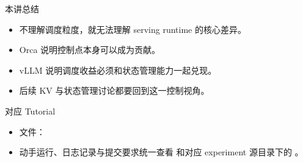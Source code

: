 \begin{frame}{本讲总结}
  \begin{itemize}
    \item 不理解调度粒度，就无法理解 serving runtime 的核心差异。
    \item Orca 说明控制点本身可以成为贡献。
    \item vLLM 说明调度收益必须和状态管理能力一起兑现。
    \item 后续 KV 与状态管理讨论都要回到这一控制视角。
  \end{itemize}
\end{frame}

\LectureFourSources

\begin{frame}{对应 Tutorial}
  \begin{itemize}
    \item 文件：\texttt{}
    \item 动手运行、日志记录与提交要求统一查看 \texttt{} 和对应 experiment 源目录下的 \texttt{}。
  \end{itemize}
\end{frame}


